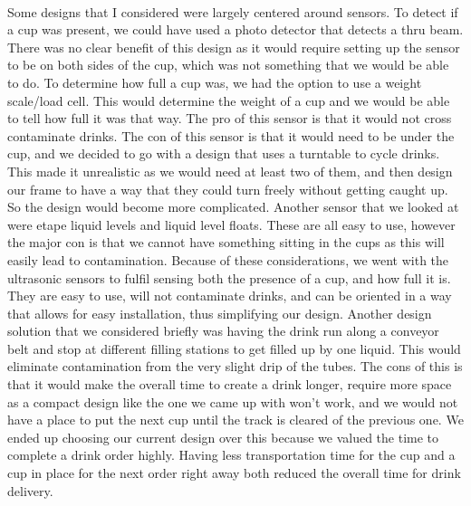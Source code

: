 \documentclass[12pt, titlepage]{article}
\begin{document}
\noindent{}\\ Some designs that I considered were largely centered around sensors. To detect if a cup was present, we could have used a photo detector that detects a thru beam. There was no clear benefit of this design as it would require setting up the sensor to be on both sides of the cup, which was not something that we would be able to do. To determine how full a cup was, we had the option to use a weight scale/load cell. This would determine the weight of a cup and we would be able to tell how full it was that way. The pro of this sensor is that it would not cross contaminate drinks. The con of this sensor is that it would need to be under the cup, and we decided to go with a design that uses a turntable to cycle drinks. This made it unrealistic as we would need at least two of them, and then design our frame to have a way that they could turn freely without getting caught up. So the design would become more complicated. Another sensor that we looked at were etape liquid levels and liquid level floats. These are all easy to use, however the major con is that we cannot have something sitting in the cups as this will easily lead to contamination. Because of these considerations, we went with the ultrasonic sensors to fulfil sensing both the presence of a cup, and how full it is. They are easy to use, will not contaminate drinks, and can be oriented in a way that allows for easy installation, thus simplifying our design. Another design solution that we considered briefly was having the drink run along a conveyor belt and stop at different filling stations to get filled up by one liquid. This would eliminate contamination from the very slight drip of the tubes. The cons of this is that it would make the overall time to create a drink longer, require more space as a compact design like the one we came up with won't work, and we would not have a place to put the next cup until the track is cleared of the previous one. We ended up choosing our current design over this because we valued the time to complete a drink order highly. Having less transportation time for the cup and a cup in place for the next order right away both reduced the overall time for drink delivery.\\
\end{document}
